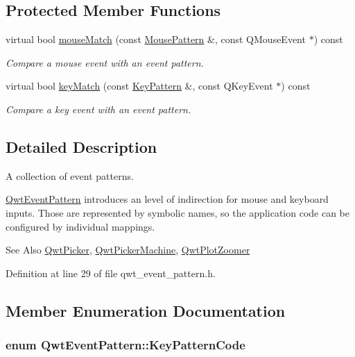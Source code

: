 \subsection*{Protected Member Functions}
\begin{DoxyCompactItemize}
\item 
virtual bool \hyperlink{class_qwt_event_pattern_a091006f03b17d638a84ab0211e5c39de}{mouse\-Match} (const \hyperlink{class_qwt_event_pattern_1_1_mouse_pattern}{Mouse\-Pattern} \&, const Q\-Mouse\-Event $\ast$) const 
\begin{DoxyCompactList}\small\item\em Compare a mouse event with an event pattern. \end{DoxyCompactList}\item 
virtual bool \hyperlink{class_qwt_event_pattern_ac2748e712cbfa8ce9eb12a3364b862de}{key\-Match} (const \hyperlink{class_qwt_event_pattern_1_1_key_pattern}{Key\-Pattern} \&, const Q\-Key\-Event $\ast$) const 
\begin{DoxyCompactList}\small\item\em Compare a key event with an event pattern. \end{DoxyCompactList}\end{DoxyCompactItemize}


\subsection{Detailed Description}
A collection of event patterns. 

\hyperlink{class_qwt_event_pattern}{Qwt\-Event\-Pattern} introduces an level of indirection for mouse and keyboard inputs. Those are represented by symbolic names, so the application code can be configured by individual mappings.

\begin{DoxySeeAlso}{See Also}
\hyperlink{class_qwt_picker}{Qwt\-Picker}, \hyperlink{class_qwt_picker_machine}{Qwt\-Picker\-Machine}, \hyperlink{class_qwt_plot_zoomer}{Qwt\-Plot\-Zoomer} 
\end{DoxySeeAlso}


Definition at line 29 of file qwt\-\_\-event\-\_\-pattern.\-h.



\subsection{Member Enumeration Documentation}
\hypertarget{class_qwt_event_pattern_a8fb57ceb9982d5583a1bf568e37d3007}{
\subsubsection[{Key\-Pattern\-Code}]{\setlength{\rightskip}{0pt plus 5cm}enum {\bf Qwt\-Event\-Pattern\-::\-Key\-Pattern\-Code}}}\label{class_qwt_event_pattern_a8fb57ceb9982d5583a1bf568e37d3007}


